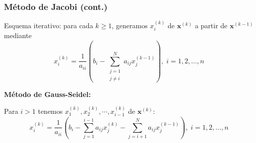 \documentclass[9pt, aspectratio=169]{beamer}
\begin{document}
\begin{frame}
 \frametitle{Método de Jacobi (cont.)}
  
 Esquema iterativo: para cada $k \geq 1$, generamos $x_i^{(k)}$ de $\bm{x}^{(k)}$ a partir de $\bm{x}^{(k-1)}$ mediante
\begin{equation*}
    x_i^{(k)} = \dfrac{1}{a_{ii}} \left( b_i - \sum_{\substack{j=1 \\j \neq i}}^N a_{ij}x_j^{(k-1)} \right), \;  i = 1, 2, \ldots, n
\end{equation*} \pause

\textbf{Método de Gauss-Seidel:}

Para $i > 1$ tenemos $x_1^{(k)}, x_2^{(k)}, \cdots,x_{i-1}^{(k)}$ de $\bm{x}^{(k)}$:
\begin{equation*}
    x_i^{(k)} = \dfrac{1}{a_{ii}} \left( b_i - \sum_{j=1}^{i-1} a_{ij}x_j^{(k)} - \sum_{j=i + 1}^N a_{ij}x_j^{(k-1)} \right), \;  i = 1, 2, \ldots, n
\end{equation*} \pause


\end{frame}
\end{document}
